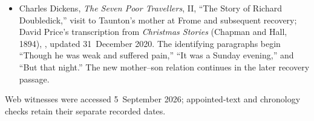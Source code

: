 {\begin{itemize}[leftmargin=1.1em,labelsep=0.35em,itemsep=0.10em,topsep=0.15em,parsep=0pt]
\item Charles Dickens, \emph{The Seven Poor Travellers}, II,
``The Story of Richard Doubledick,'' visit to Taunton's mother at Frome
and subsequent recovery; David Price's transcription from
\emph{Christmas Stories} (Chapman and Hall, 1894),
, updated
31~December 2020. The identifying paragraphs begin ``Though he was weak
and suffered pain,'' ``It was a Sunday evening,'' and ``But that night.''
The new mother--son relation continues in the later recovery passage.
\end{itemize}

\noindent Web witnesses were accessed 5~September 2026; appointed-text and
chronology checks retain their separate recorded dates.
}
